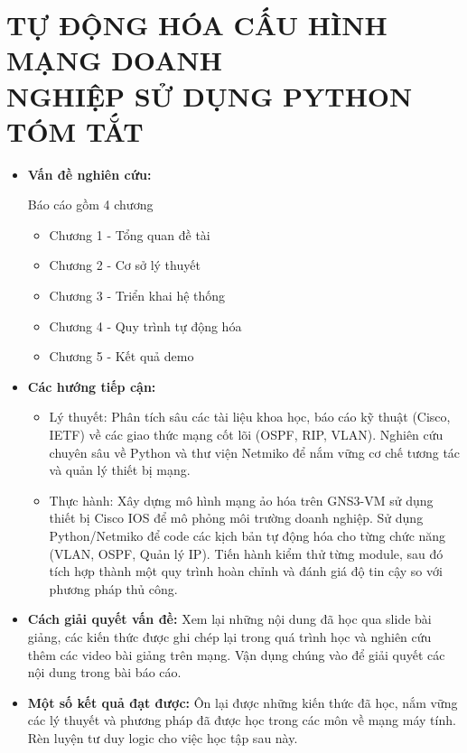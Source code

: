 \section*{TỰ ĐỘNG HÓA CẤU HÌNH MẠNG DOANH \\NGHIỆP SỬ DỤNG PYTHON \\TÓM TẮT}

\begin{itemize}
    \item[-] \textbf{Vấn đề nghiên cứu:}
    
    Báo cáo gồm 4 chương
        \begin{itemize}
        \item[•] Chương 1 - Tổng quan đề tài
        \item[•] Chương 2 - Cơ sở lý thuyết
        \item[•] Chương 3 - Triển khai hệ thống
        \item[•] Chương 4 - Quy trình tự động hóa
        \item[•] Chương 5 - Kết quả demo
        \end{itemize}
    \item[-] \textbf{Các hướng tiếp cận:}
        \begin{itemize}
        \item[•] Lý thuyết:
        Phân tích sâu các tài liệu khoa học, báo cáo kỹ thuật (Cisco, IETF) về các giao thức mạng cốt lõi (OSPF, RIP, VLAN).
        Nghiên cứu chuyên sâu về Python và thư viện Netmiko để nắm vững cơ chế tương tác và quản lý thiết bị mạng.
        \item[•]Thực hành:
        Xây dựng mô hình mạng ảo hóa trên GNS3-VM sử dụng thiết bị Cisco IOS để mô phỏng môi trường doanh nghiệp.
        Sử dụng Python/Netmiko để code các kịch bản tự động hóa cho từng chức năng (VLAN, OSPF, Quản lý IP).
        Tiến hành kiểm thử từng module, sau đó tích hợp thành một quy trình hoàn chỉnh và đánh giá độ tin cậy so với phương pháp thủ công.
        \end{itemize}
    \item[-] \textbf{Cách giải quyết vấn đề:}
    Xem lại những nội dung đã học qua slide bài giảng, các kiến thức được ghi chép lại trong quá trình học và nghiên cứu thêm các video bài giảng trên mạng. Vận dụng chúng vào để giải quyết các nội dung trong bài báo cáo.
    \item[-] \textbf{Một số kết quả đạt được:}
    Ôn lại được những kiến thức đã học, nắm vững các lý thuyết và phương pháp đã được học trong các môn về mạng máy tính. Rèn luyện tư duy logic cho việc học tập sau này.
\end{itemize}

\newpage
